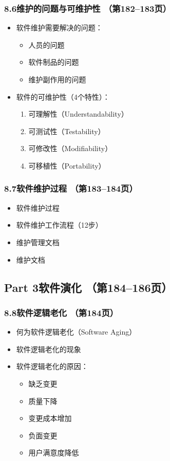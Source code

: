 \documentclass[12pt,a4paper]{ctexart}
\begin{document}
\subsubsection{8.6\quad 维护的问题与可维护性 \hfill（第182--183页）}
\begin{itemize}
    \item 软件维护需要解决的问题：
    \begin{itemize}
        \item 人员的问题
        \item 软件制品的问题
        \item 维护副作用的问题
    \end{itemize}
    \item 软件的可维护性（4个特性）：
    \begin{enumerate}
        \item 可理解性（Understandability）
        \item 可测试性（Testability）
        \item 可修改性（Modifiability）
        \item 可移植性（Portability）
    \end{enumerate}
\end{itemize}

\subsubsection{8.7\quad 软件维护过程 \hfill（第183--184页）}
\begin{itemize}
    \item 软件维护过程
    \item 软件维护工作流程（12步）
    \item 维护管理文档
    \item 维护文档
\end{itemize}

\subsection{Part 3\quad 软件演化 \hfill（第184--186页）}

\subsubsection{8.8\quad 软件逻辑老化 \hfill（第184页）}
\begin{itemize}
    \item 何为软件逻辑老化（Software Aging）
    \item 软件逻辑老化的现象
    \item 软件逻辑老化的原因：
    \begin{itemize}
        \item 缺乏变更
        \item 质量下降
        \item 变更成本增加
        \item 负面变更
        \item 用户满意度降低
    \end{itemize}
\end{itemize}
\end{document}
